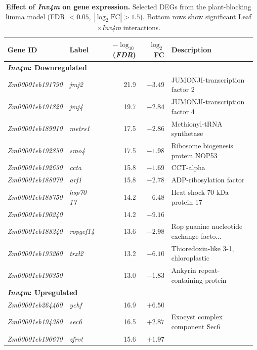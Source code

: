 \documentclass[9pt,twocolumn,twoside]{rilabRxiv}
\newcommand{\invfour}{\textit{Inv4m}\xspace}
\begin{document}
\clearpage



\begin{table}[!ht]
\caption{\textbf{Effect of \invfour on gene expression.} Selected DEGs from the plant-blocking limma model (FDR $< 0.05$, $|\log_2 \text{FC}| > 1.5$). Bottom rows show significant Leaf$\times$\invfour interactions.}
\label{tab:gene_effects}
\centering
\small
\begin{tabular}{@{}llrrl@{}}
\toprule
\textbf{Gene ID} & \textbf{Label} & \textbf{$-\log_{10}$(\textit{FDR})} & \textbf{$\log_2$FC} & \textbf{Description} \\ \midrule
\multicolumn{5}{l}{\textbf{\invfour: Downregulated}} \\ \midrule
\textit{Zm00001eb191790} & \textit{jmj2} & 21.9 & $-3.49$ & JUMONJI-transcription factor 2 \\
\textit{Zm00001eb191820} & \textit{jmj4} & 19.7 & $-2.84$ & JUMONJI-transcription factor 4 \\
\textit{Zm00001eb189910} & \textit{metrs1} & 17.5 & $-2.86$ & Methionyl-tRNA synthetase \\
\textit{Zm00001eb192850} & \textit{smo4} & 17.5 & $-1.98$ & Ribosome biogenesis protein NOP53 \\
\textit{Zm00001eb192630} & \textit{ccta} & 15.8 & $-1.69$ & CCT-alpha \\
\textit{Zm00001eb188070} & \textit{arf1} & 15.8 & $-2.78$ & ADP-ribosylation factor \\
\textit{Zm00001eb188750} & \textit{hsp70-17} & 14.2 & $-6.48$ & Heat shock 70 kDa protein 17 \\
\textit{Zm00001eb190240} &  & 14.2 & $-9.16$ &  \\
\textit{Zm00001eb188240} & \textit{ropgef14} & 13.6 & $-2.98$ & Rop guanine nucleotide exchange facto... \\
\textit{Zm00001eb193260} & \textit{trxl2} & 13.2 & $-6.10$ & Thioredoxin-like 3-1, chloroplastic \\
\textit{Zm00001eb190350} &  & 13.0 & $-1.83$ & Ankyrin repeat-containing protein \\
\midrule
\multicolumn{5}{l}{\textbf{\invfour: Upregulated}} \\ \midrule
\textit{Zm00001eb264460} & \textit{ychf} & 16.9 & $+6.50$ &  \\
\textit{Zm00001eb194380} & \textit{sec6} & 16.5 & $+2.87$ & Exocyst complex component Sec6 \\
\textit{Zm00001eb190670} & \textit{zfrvt} & 15.6 & $+1.97$ &  \\

\end{tabular}
\end{table}
\end{document}
